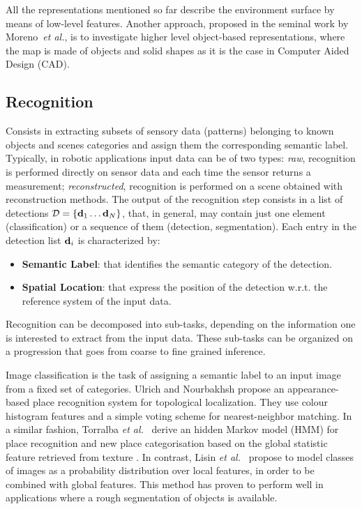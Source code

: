 \documentclass[conference]{IEEEtran}
\newcommand\etal{\emph{et al.}}
\begin{document}
All the representations mentioned so far describe the environment
surface by means of low-level features. Another approach, proposed in
the seminal work by Moreno~\etal \cite{salas2013CVPR}, is to
investigate higher level object-based representations, where the map
is made of objects and solid shapes as it is the case in Computer
Aided Design (CAD).

\subsection{Recognition}

Consists in extracting subsets of sensory data (patterns) belonging to
known objects and scenes categories and assign them the corresponding
semantic label. Typically, in robotic applications input data can be
of two types: \emph{raw}, recognition is performed directly on sensor
data and each time the sensor returns a measurement;
\emph{reconstructed}, recognition is performed on a scene obtained
with reconstruction methods. The output of the recognition step
consists in a list of detections $\mathcal{D} = \{ \mathbf{d}_1 \dots \mathbf{d}_N \}$,
that, in general, may contain just one element (classification) or a
sequence of them (detection, segmentation). Each entry in the
detection list $\mathbf{d}_i$ is characterized by:
\begin{itemize}
	\item {\bf Semantic Label}: that identifies the semantic category of the detection. 
	\item {\bf Spatial Location}: that express the position of the detection w.r.t. the reference system of the input data.
\end{itemize}

Recognition can be decomposed into sub-tasks, depending on the
information one is interested to extract from the input data. These
sub-tasks can be organized on a progression that goes from coarse to
fine grained inference.

Image classification is the task of assigning a semantic label to an
input image from a fixed set of categories. Ulrich and Nourbakhsh
\cite{ulrich2000icra} propose an appearance-based place recognition
system for topological localization. They use colour histogram
features \cite{swain1991ijcv} and a simple voting scheme for
nearest-neighbor matching. In a similar fashion, Torralba
\etal~\cite{torralba2003context} derive an hidden Markov model (HMM)
for place recognition and new place categorisation based on the global
statistic feature retrieved from texture \cite{oliva2001ijcv}. In
contrast, Lisin \etal~\cite{lisin2005cvpr} propose to model classes of
images as a probability distribution over local features, in order to
be combined with global features. This method has proven to perform
well in applications where a rough segmentation of objects is
available.
\end{document}
